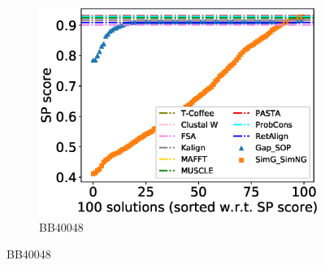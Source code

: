 \begin{figure}[!htbp]
\begin{adjustwidth}{-1.5cm}{-1cm}
\begin{subfigure}{0.22\textwidth}
			\includegraphics[width=\columnwidth]{Figure/summary/precomputedInit/Balibase/BB40048_pairs_density_single_run_2}
			\caption{BB40048}
		\end{subfigure}
		

\end{adjustwidth}
\end{figure}
